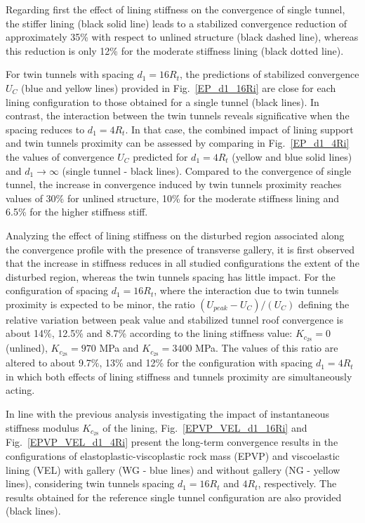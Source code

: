 \documentclass[Journal,letterpaper, NoLists,SectionNumbers]{ascelike-new}
\begin{document}
Regarding first the effect of lining stiffness on the convergence of single tunnel, the stiffer lining (black solid line) leads to a stabilized convergence reduction of approximately 35\% with respect to unlined structure (black dashed line), whereas this reduction is only 12\% for the moderate stiffness lining (black dotted line).

For twin tunnels with spacing $d_1=16R_t$, the predictions of stabilized convergence $U_C$ (blue and yellow lines) provided in Fig.~\ref{EP_d1_16Ri} are close for each lining configuration to those obtained for a single tunnel (black lines). In contrast, the interaction between the twin tunnels reveals significative when the spacing reduces to $d_1=4R_t$. In that case, the combined impact of lining support and twin tunnels proximity can be assessed by comparing in Fig.~\ref{EP_d1_4Ri} the values of convergence $U_C$ predicted for $d_1=4R_t$ (yellow and blue solid lines) and $d_1 \rightarrow \infty$ (single tunnel - black lines). Compared to the convergence of single tunnel, the increase in convergence induced by twin tunnels proximity reaches values of 30\% for unlined structure, 10\% for the moderate stiffness lining  and 6.5\% for the higher stiffness stiff. 


Analyzing the effect of lining stiffness on the disturbed region associated along the convergence profile with the presence of transverse gallery, it is first observed that the increase in stiffness reduces in all studied configurations the extent of the disturbed region, whereas the twin tunnels spacing has little impact. For the configuration of spacing $d_1=16R_t$, where the interaction due to twin tunnels proximity is expected to be minor,   the ratio $(U_{peak}-U_C)/(U_C)$ defining the relative variation between peak value and stabilized tunnel roof convergence is about 14\%, 12.5\% and 8.7\% according to the lining stiffness value: $K_{c_{28}}=0$ (unlined), $K_{c_{28}}=970$ MPa and $K_{c_{28}}=3400$ MPa. The values of this ratio are altered to about 9.7\%, 13\% and 12\% for the configuration with spacing $d_1=4R_t$ in which both effects of lining stiffness and tunnels proximity are simultaneously acting.

In line with the previous analysis investigating the impact of instantaneous stiffness modulus $K_{c_{28}}$ of the lining, Fig.~\ref{EPVP_VEL_d1_16Ri} and Fig.~\ref{EPVP_VEL_d1_4Ri} present the long-term convergence results in the configurations of elastoplastic-viscoplastic rock mass (EPVP) and  viscoelastic lining (VEL) with gallery (WG - blue lines) and without gallery (NG - yellow lines), considering  twin tunnels spacing $d_1=16R_t$ and $4R_t$, respectively. The results obtained for the reference single tunnel configuration are also provided (black lines).
\end{document}
